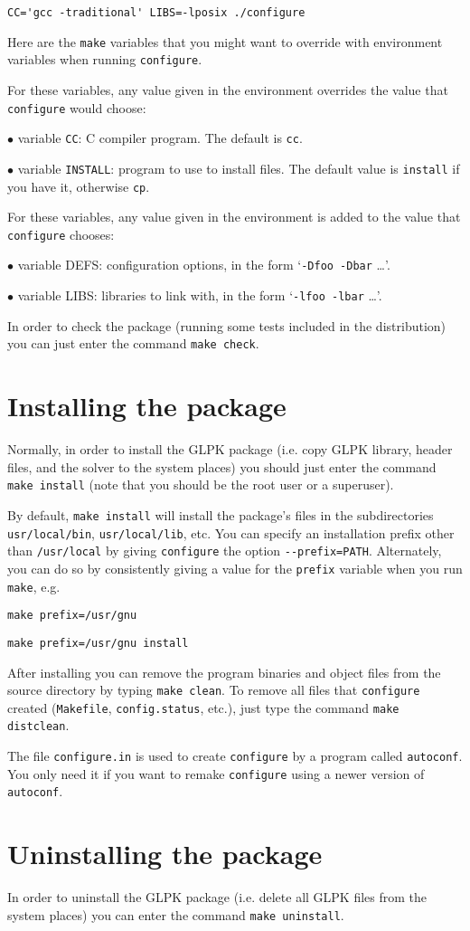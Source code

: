 \verb|CC='gcc -traditional' LIBS=-lposix ./configure|

Here are the \verb|make| variables that you might want to override with
environment variables when running \verb|configure|.

For these variables, any value given in the environment overrides the
value that \verb|configure| would choose:

$\bullet$ variable \verb|CC|: C compiler program. The default is
\verb|cc|.

$\bullet$ variable \verb|INSTALL|: program to use to install files. The
default value is \verb|install| if you have it, otherwise \verb|cp|.

For these variables, any value given in the environment is added to the
value that \verb|configure| chooses:

$\bullet$ variable DEFS: configuration options, in the form
`\verb|-Dfoo -Dbar| \dots'.

$\bullet$ variable LIBS: libraries to link with, in the form
`\verb|-lfoo -lbar| \dots'.

In order to check the package (running some tests included in the
distribution) you can just enter the command \verb|make check|.

\section{Installing the package}

Normally, in order to install the GLPK package (i.e. copy GLPK library,
header files, and the solver to the system places) you should just enter
the command \verb|make install| (note that you should be the root user
or a superuser).

By default, \verb|make install| will install the package's files in
the subdirectories \verb|usr/local/bin|, \verb|usr/local/lib|, etc. You
can specify an installation prefix other than \verb|/usr/local| by
giving \verb|configure| the option \verb|--prefix=PATH|. Alternately,
you can do so by consistently giving a value for the \verb|prefix|
variable when you run \verb|make|, e.g.

\verb|make prefix=/usr/gnu|

\verb|make prefix=/usr/gnu install|

After installing you can remove the program binaries and object files
from the source directory by typing \verb|make clean|. To remove all
files that \verb|configure| created (\verb|Makefile|,
\verb|config.status|, etc.), just type the command
\verb|make distclean|.

The file \verb|configure.in| is used to create \verb|configure| by a
program called \verb|autoconf|. You only need it if you want to remake
\verb|configure| using a newer version of \verb|autoconf|.

\section{Uninstalling the package}

In order to uninstall the GLPK package (i.e. delete all GLPK files from
the system places) you can enter the command \verb|make uninstall|.

